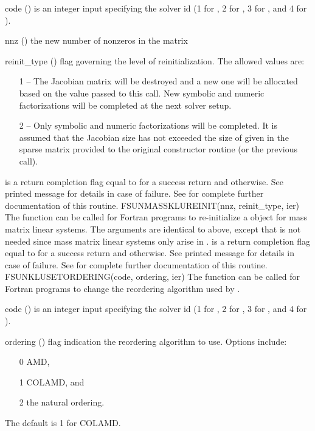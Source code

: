 {
  \begin{args}
  \item[code] ()
    is an integer input specifying the solver id (1 for {\cvode}, 2
    for {\ida}, 3 for {\kinsol}, and 4 for {\arkode}).
  \item[nnz] ()
    the new number of nonzeros in the matrix
  \item[reinit\_type] ()
    flag governing the level of reinitialization.  The allowed values
    are:
    \begin{itemize}
    \item[1] -- The Jacobian matrix will be
      destroyed and a new one will be allocated based on the 
      value passed to this call.  New symbolic and numeric
      factorizations will be completed at the next solver setup. 
    \item[2] -- Only symbolic and numeric 
      factorizations will be completed.  It is assumed that the
      Jacobian size has not exceeded the size of  given in the
      sparse matrix provided to the original constructor routine (or
      the previous  call). 
    \end{itemize}
  \end{args}
}
{
   is a  return completion flag equal to  for a success
  return and  otherwise. See printed message for details in case
  of failure.
}
{
  See  for complete further documentation of
  this routine. 
}
%
%
{
  FSUNMASSKLUREINIT(nnz, reinit\_type, ier)
}
{
  The function  can be called for Fortran programs
  to re-initialize a {\sunlinsolklu} object for mass matrix linear systems.
}
{
  The arguments are identical to  above, except that
   is not needed since mass matrix linear systems only arise
  in {\arkode}.
}
{
   is a  return completion flag equal to  for a success
  return and  otherwise. See printed message for details in case
  of failure.
}
{
  See  for complete further documentation of
  this routine. 
}
%
%
{
  FSUNKLUSETORDERING(code, ordering, ier)
}
{
  The function  can be called for Fortran programs
  to change the reordering algorithm used by {\klu}.
}
{
  \begin{args}[ordering]
  \item[code] ()
    is an integer input specifying the solver id (1 for {\cvode}, 2
    for {\ida}, 3 for {\kinsol}, and 4 for {\arkode}).
  \item[ordering] ()
    flag indication the reordering algorithm to use.  Options include:
    \begin{itemize}
    \item[0] AMD,
    \item[1] COLAMD, and
    \item[2] the natural ordering.
    \end{itemize}
    The default is 1 for COLAMD.
  \end{args}
}
